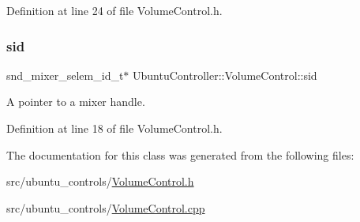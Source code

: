 Definition at line 24 of file Volume\+Control.\+h.

\mbox{\label{class_ubuntu_controller_1_1_volume_control_a129acd7b00686987ce7631110b283751}} 
\subsubsection{\texorpdfstring{sid}{sid}}
{\footnotesize\ttfamily snd\+\_\+mixer\+\_\+selem\+\_\+id\+\_\+t$\ast$ Ubuntu\+Controller\+::\+Volume\+Control\+::sid\hspace{0.3cm}{\ttfamily [private]}}



A pointer to a mixer handle. 



Definition at line 18 of file Volume\+Control.\+h.



The documentation for this class was generated from the following files\+:\begin{DoxyCompactItemize}
\item 
src/ubuntu\+\_\+controls/\hyperlink{_volume_control_8h}{Volume\+Control.\+h}\item 
src/ubuntu\+\_\+controls/\hyperlink{_volume_control_8cpp}{Volume\+Control.\+cpp}\end{DoxyCompactItemize}
